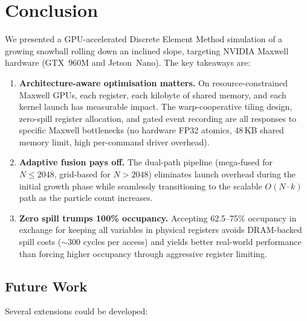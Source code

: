 \section{Conclusion}
\label{sec:conclusion}

We presented a GPU-accelerated Discrete Element Method simulation of a
growing snowball rolling down an inclined slope, targeting NVIDIA Maxwell
hardware (GTX~960M and Jetson~Nano). The key takeaways are:

\begin{enumerate}
  \item \textbf{Architecture-aware optimisation matters.} On resource-constrained
        Maxwell GPUs, each register, each kilobyte of shared memory, and each
        kernel launch has measurable impact. The warp-cooperative tiling design,
        zero-spill register allocation, and gated event recording are all
        responses to specific Maxwell bottlenecks (no hardware FP32 atomics,
        48\,KB shared memory limit, high per-command driver overhead).

  \item \textbf{Adaptive fusion pays off.} The dual-path pipeline
        (mega-fused for $N \leq 2048$, grid-based for $N > 2048$) eliminates
        launch overhead during the initial growth phase while seamlessly
        transitioning to the scalable $O(N \cdot k)$ path as the particle
        count increases.

  \item \textbf{Zero spill trumps 100\% occupancy.} Accepting 62.5--75\%
        occupancy in exchange for keeping all variables in physical registers
        avoids DRAM-backed spill costs ($\sim$300 cycles per access) and
        yields better real-world performance than forcing higher occupancy
        through aggressive register limiting.

  \end{enumerate}

\subsection{Future Work}

Several extensions could be developed:


